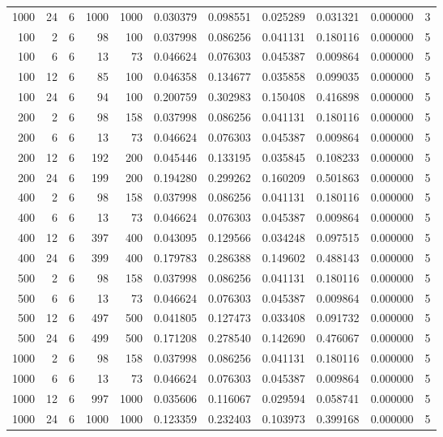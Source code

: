 \begin{table}
\begin{tabular}{rrrrrrrrrrr}
1000 & 24 & 6 & 1000 & 1000 & 0.030379 & 0.098551 & 0.025289 & 0.031321 & 0.000000 & 3 \\
100 & 2 & 6 & 98 & 100 & 0.037998 & 0.086256 & 0.041131 & 0.180116 & 0.000000 & 5 \\
100 & 6 & 6 & 13 & 73 & 0.046624 & 0.076303 & 0.045387 & 0.009864 & 0.000000 & 5 \\
100 & 12 & 6 & 85 & 100 & 0.046358 & 0.134677 & 0.035858 & 0.099035 & 0.000000 & 5 \\
100 & 24 & 6 & 94 & 100 & 0.200759 & 0.302983 & 0.150408 & 0.416898 & 0.000000 & 5 \\
200 & 2 & 6 & 98 & 158 & 0.037998 & 0.086256 & 0.041131 & 0.180116 & 0.000000 & 5 \\
200 & 6 & 6 & 13 & 73 & 0.046624 & 0.076303 & 0.045387 & 0.009864 & 0.000000 & 5 \\
200 & 12 & 6 & 192 & 200 & 0.045446 & 0.133195 & 0.035845 & 0.108233 & 0.000000 & 5 \\
200 & 24 & 6 & 199 & 200 & 0.194280 & 0.299262 & 0.160209 & 0.501863 & 0.000000 & 5 \\
400 & 2 & 6 & 98 & 158 & 0.037998 & 0.086256 & 0.041131 & 0.180116 & 0.000000 & 5 \\
400 & 6 & 6 & 13 & 73 & 0.046624 & 0.076303 & 0.045387 & 0.009864 & 0.000000 & 5 \\
400 & 12 & 6 & 397 & 400 & 0.043095 & 0.129566 & 0.034248 & 0.097515 & 0.000000 & 5 \\
400 & 24 & 6 & 399 & 400 & 0.179783 & 0.286388 & 0.149602 & 0.488143 & 0.000000 & 5 \\
500 & 2 & 6 & 98 & 158 & 0.037998 & 0.086256 & 0.041131 & 0.180116 & 0.000000 & 5 \\
500 & 6 & 6 & 13 & 73 & 0.046624 & 0.076303 & 0.045387 & 0.009864 & 0.000000 & 5 \\
500 & 12 & 6 & 497 & 500 & 0.041805 & 0.127473 & 0.033408 & 0.091732 & 0.000000 & 5 \\
500 & 24 & 6 & 499 & 500 & 0.171208 & 0.278540 & 0.142690 & 0.476067 & 0.000000 & 5 \\
1000 & 2 & 6 & 98 & 158 & 0.037998 & 0.086256 & 0.041131 & 0.180116 & 0.000000 & 5 \\
1000 & 6 & 6 & 13 & 73 & 0.046624 & 0.076303 & 0.045387 & 0.009864 & 0.000000 & 5 \\
1000 & 12 & 6 & 997 & 1000 & 0.035606 & 0.116067 & 0.029594 & 0.058741 & 0.000000 & 5 \\
1000 & 24 & 6 & 1000 & 1000 & 0.123359 & 0.232403 & 0.103973 & 0.399168 & 0.000000 & 5 \\

\end{tabular}
\end{table}

